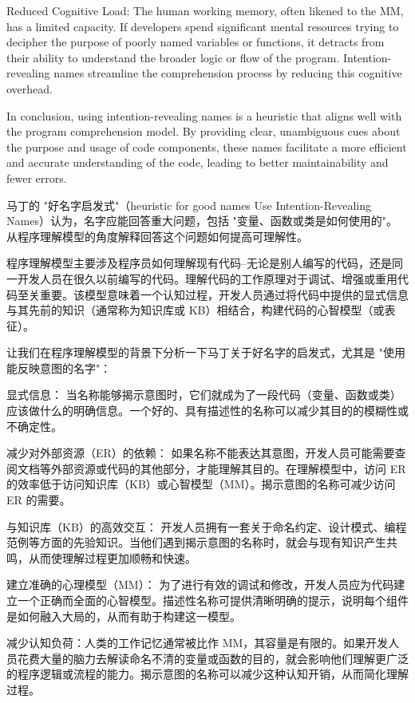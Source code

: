Reduced Cognitive Load: The human working memory, often likened to the MM, has a limited capacity. If developers spend significant mental resources trying to decipher the purpose of poorly named variables or functions, it detracts from their ability to understand the broader logic or flow of the program. Intention-revealing names streamline the comprehension process by reducing this cognitive overhead.

In conclusion, using intention-revealing names is a heuristic that aligns well with the program comprehension model. By providing clear, unambiguous cues about the purpose and usage of code components, these names facilitate a more efficient and accurate understanding of the code, leading to better maintainability and fewer errors.

马丁的 "好名字启发式"（heuristic for good names Use Intention-Revealing Names）认为，名字应能回答重大问题，包括 "变量、函数或类是如何使用的"。
从程序理解模型的角度解释回答这个问题如何提高可理解性。

程序理解模型主要涉及程序员如何理解现有代码--无论是别人编写的代码，还是同一开发人员在很久以前编写的代码。理解代码的工作原理对于调试、增强或重用代码至关重要。该模型意味着一个认知过程，开发人员通过将代码中提供的显式信息与其先前的知识（通常称为知识库或 KB）相结合，构建代码的心智模型（或表征）。

让我们在程序理解模型的背景下分析一下马丁关于好名字的启发式，尤其是 "使用能反映意图的名字"：

显式信息： 当名称能够揭示意图时，它们就成为了一段代码（变量、函数或类）应该做什么的明确信息。一个好的、具有描述性的名称可以减少其目的的模糊性或不确定性。

减少对外部资源（ER）的依赖： 如果名称不能表达其意图，开发人员可能需要查阅文档等外部资源或代码的其他部分，才能理解其目的。在理解模型中，访问 ER 的效率低于访问知识库（KB）或心智模型（MM）。揭示意图的名称可减少访问 ER 的需要。

与知识库（KB）的高效交互： 开发人员拥有一套关于命名约定、设计模式、编程范例等方面的先验知识。当他们遇到揭示意图的名称时，就会与现有知识产生共鸣，从而使理解过程更加顺畅和快速。

建立准确的心理模型（MM）： 为了进行有效的调试和修改，开发人员应为代码建立一个正确而全面的心智模型。描述性名称可提供清晰明确的提示，说明每个组件是如何融入大局的，从而有助于构建这一模型。

减少认知负荷：人类的工作记忆通常被比作 MM，其容量是有限的。如果开发人员花费大量的脑力去解读命名不清的变量或函数的目的，就会影响他们理解更广泛的程序逻辑或流程的能力。揭示意图的名称可以减少这种认知开销，从而简化理解过程。

